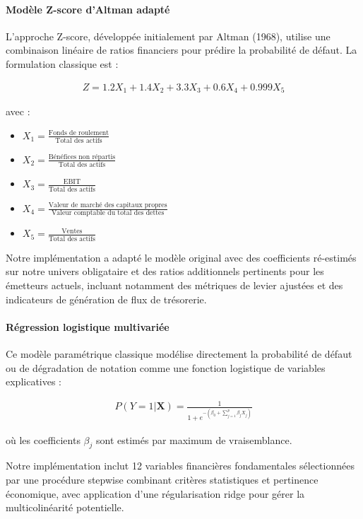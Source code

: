 \paragraph{Modèle Z-score d'Altman adapté} L'approche Z-score, développée initialement par Altman (1968), utilise une combinaison linéaire de ratios financiers pour prédire la probabilité de défaut. La formulation classique est :

\begin{align}
Z = 1.2X_1 + 1.4X_2 + 3.3X_3 + 0.6X_4 + 0.999X_5
\end{align}

avec :
\begin{itemize}
    \item $X_1 = \frac{\text{Fonds de roulement}}{\text{Total des actifs}}$
    \item $X_2 = \frac{\text{Bénéfices non répartis}}{\text{Total des actifs}}$
    \item $X_3 = \frac{\text{EBIT}}{\text{Total des actifs}}$
    \item $X_4 = \frac{\text{Valeur de marché des capitaux propres}}{\text{Valeur comptable du total des dettes}}$
    \item $X_5 = \frac{\text{Ventes}}{\text{Total des actifs}}$
\end{itemize}

Notre implémentation a adapté le modèle original avec des coefficients ré-estimés sur notre univers obligataire et des ratios additionnels pertinents pour les émetteurs actuels, incluant notamment des métriques de levier ajustées et des indicateurs de génération de flux de trésorerie.

\paragraph{Régression logistique multivariée} Ce modèle paramétrique classique modélise directement la probabilité de défaut ou de dégradation de notation comme une fonction logistique de variables explicatives :

\begin{align}
P(Y=1|\mathbf{X}) = \frac{1}{1 + e^{-(\beta_0 + \sum_{j=1}^p \beta_j X_j)}}
\end{align}

où les coefficients $\beta_j$ sont estimés par maximum de vraisemblance.

Notre implémentation inclut 12 variables financières fondamentales sélectionnées par une procédure stepwise combinant critères statistiques et pertinence économique, avec application d'une régularisation ridge pour gérer la multicolinéarité potentielle.

